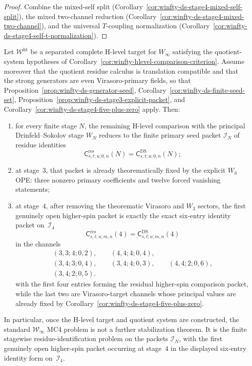 \begin{proof}
Combine the mixed-self split (Corollary~\ref{cor:winfty-ds-stage4-mixed-self-split}), the mixed two-channel reduction (Corollary~\ref{cor:winfty-ds-stage4-mixed-two-channel}), and the universal $T$-coupling normalization (Corollary~\ref{cor:winfty-ds-stage4-self-t-normalization}).
\end{proof}

\begin{proposition}
\label{prop:winfty-mc4-frontier-package}
Let $\mathcal{W}^{\mathrm{ht}}$ be a separated complete H-level target
for $W_\infty$ satisfying the quotient-system hypotheses of
Corollary~\ref{cor:winfty-hlevel-comparison-criterion}.  Assume
moreover that the quotient residue calculus is translation compatible
and that the strong generators are even Virasoro-primary fields, so
that
Proposition~\ref{prop:winfty-ds-generator-seed},
Corollary~\ref{cor:winfty-ds-finite-seed-set},
Proposition~\ref{prop:winfty-ds-stage3-explicit-packet}, and
Corollary~\ref{cor:winfty-ds-stage4-five-plus-zero} apply.  Then:
\begin{enumerate}
\item for every finite stage $N$, the remaining H-level comparison with
  the principal Drinfeld--Sokolov stage $W_N$ reduces to the finite
  primary seed packet $\mathcal{I}_N$ of residue identities
  \[
  \mathsf{C}^{\mathrm{res}}_{s,t;u;0,n}(N)
  =\mathsf{C}^{\mathrm{DS}}_{s,t;u;0,n}(N);
  \]
\item at stage~$3$, that packet is already theorematically fixed by the
  explicit $W_3$ OPE: three nonzero primary coefficients and twelve
  forced vanishing statements;
\item at stage~$4$, after removing the theorematic Virasoro and
  $W_3$ sectors, the first genuinely open higher-spin packet is exactly
  the exact six-entry identity packet on~$\mathcal{I}_4$
  \[
  \mathsf{C}^{\mathrm{res}}_{s,t;u;m,n}(4)
  =
  \mathsf{C}^{\mathrm{DS}}_{s,t;u;m,n}(4)
  \]
  in the channels
  \[
  \begin{gathered}
  (3,3;4;0,2),\qquad
  (4,4;4;0,4),\\
  (3,4;3;0,4),\qquad
  (3,4;4;0,3),\qquad
  (4,4;2;0,6),\\
  (3,4;2;0,5).
  \end{gathered}
  \]
  with the first four entries forming the residual higher-spin
  comparison packet, while the last two are Virasoro-target channels
  whose principal values are already fixed by
  Corollary~\ref{cor:winfty-ds-stage4-five-plus-zero}.
\end{enumerate}
In particular, once the H-level target and quotient system are
constructed, the standard $\mathcal{W}_\infty$ MC4 problem is not a
further stabilization theorem.  It is the finite stagewise
residue-identification problem on the packets $\mathcal{I}_N$, with the
first genuinely open higher-spin packet occurring at stage~$4$ in the
displayed six-entry identity form on~$\mathcal{I}_4$.
\end{proposition}

